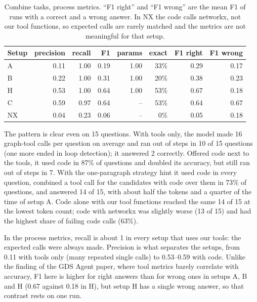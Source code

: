 \begin{table}[ht]
  \centering
  \small
  \caption[Combine tasks, process metrics]{Combine tasks, process metrics. ``F1 right'' and ``F1 wrong'' are the mean
  F1 of runs with a correct and a wrong answer. In NX the code calls networkx, not our tool functions, so expected calls
  are rarely matched and the metrics are not meaningful for that setup.}
  \label{tab:combine-process}
  \begin{tabular}{lrrrrrrr}
    \toprule
    Setup & precision & recall & F1 & params & exact & F1 right & F1 wrong \\
    \midrule
    A & 0.11 & 1.00 & 0.19 & 1.00 & 33\% & 0.29 & 0.17 \\
    B & 0.22 & 1.00 & 0.31 & 1.00 & 20\% & 0.38 & 0.23 \\
    H & 0.53 & 1.00 & 0.64 & 1.00 & 53\% & 0.67 & 0.18 \\
    C & 0.59 & 0.97 & 0.64 & -- & 53\% & 0.64 & 0.67 \\
    NX & 0.04 & 0.23 & 0.06 & -- & 0\% & 0.05 & 0.18 \\
    \bottomrule
  \end{tabular}
\end{table}

The pattern is clear even on 15 questions. With tools only, the model made 16 graph-tool calls per question on
average and ran out of steps in 10 of 15 questions (one more ended in loop detection); it answered 2 correctly. Offered
code next to the tools, it used code in 87\% of questions and doubled its accuracy, but still ran out of steps in 7.
With the one-paragraph strategy hint it used code in every question, combined a tool call for the candidates with code
over them in 73\% of questions, and answered 14 of 15, with about half the tokens and a quarter of the time of setup A.
Code alone with our tool functions reached the same 14 of 15 at the lowest token count; code with networkx was slightly
worse (13 of 15) and had the highest share of failing code calls (63\%).

In the process metrics, recall is about 1 in every setup that uses our tools: the expected calls were always made.
Precision is what separates the setups, from 0.11 with tools only (many repeated single calls) to 0.53--0.59 with code.
Unlike the finding of the GDS Agent paper, where tool metrics barely correlate with accuracy, F1 here is higher for
right answers than for wrong ones in setups A, B and H (0.67 against 0.18 in H), but setup H has a single wrong answer,
so that contrast rests on one run.

